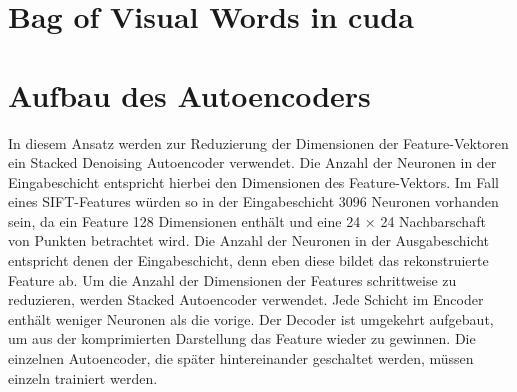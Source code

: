 \section{Bag of Visual Words in cuda}

\section{Aufbau des Autoencoders}

In diesem Ansatz werden zur Reduzierung der Dimensionen der Feature-Vektoren ein Stacked Denoising Autoencoder verwendet. Die Anzahl der Neuronen in der Eingabeschicht entspricht hierbei den Dimensionen des Feature-Vektors. Im Fall eines SIFT-Features würden so in der Eingabeschicht 3096 Neuronen vorhanden sein, da ein Feature 128 Dimensionen enthält und eine 24 $\times$ 24 Nachbarschaft von Punkten betrachtet wird. Die Anzahl der Neuronen in der Ausgabeschicht entspricht denen der Eingabeschicht, denn eben diese bildet das rekonstruierte Feature ab. Um die Anzahl der Dimensionen der Features schrittweise zu reduzieren, werden Stacked Autoencoder verwendet. Jede Schicht im Encoder enthält weniger Neuronen als die vorige. Der Decoder ist umgekehrt aufgebaut, um aus der komprimierten Darstellung das Feature wieder zu gewinnen. Die einzelnen Autoencoder, die später hintereinander geschaltet werden, müssen einzeln trainiert werden.